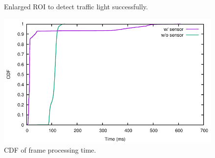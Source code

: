 \begin{figure}[!ht]
\centering
{}

\caption{Enlarged ROI to detect traffic light successfully.}
\label{f:rec_enl}
\end{figure}




\begin{figure}
\centering
\includegraphics[width=5.2in]{plots/cdf_time.pdf}
\caption{CDF of frame processing time.}
\label{f:cdf_time}
\end{figure}


